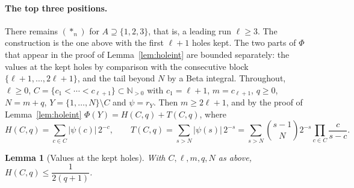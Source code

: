 \documentclass[11pt]{article}
\newtheorem{lemma}[theorem]{Lemma}
\newcommand{\N}{\mathbb N}
\begin{document}
\paragraph{The top three positions.}
There remains $(\ast_n)$ for $A\supseteq\{1,2,3\}$, that is, a leading run
$\ell\ge3$.  The construction is the one above with the first $\ell+1$ holes kept.
The two parts of $\Phi$ that appear in the proof of Lemma~\ref{lem:holeint}
are bounded separately: the values at the kept holes by comparison with the
consecutive block $\{\ell+1,\ldots,2\ell+1\}$, and the tail beyond $N$ by a Beta
integral.  Throughout, $\ell\ge0$, $C=\{c_1<\cdots<c_{\ell+1}\}\subset\N_{>0}$ with
$c_1=\ell+1$, $m=c_{\ell+1}$, $q\ge0$, $N=m+q$, $Y=\{1,\ldots,N\}\setminus C$ and
$\psi=r_Y$.  Then $m\ge2\ell+1$, and by the proof of Lemma~\ref{lem:holeint}
$\Phi(Y)=H(C,q)+T(C,q)$, where
\[
  H(C,q)=\sum_{c\in C}|\psi(c)|\,2^{-c},\qquad
  T(C,q)=\sum_{s>N}|\psi(s)|\,2^{-s}
        =\sum_{s>N}\binom{s-1}N2^{-s}\prod_{c\in C}\frac c{s-c}.
\]

\begin{lemma}[Values at the kept holes]\label{lem:holevals}
With $C,\ell,m,q,N$ as above, $H(C,q)\le\dfrac1{2(q+1)}$.
\end{lemma}
\end{document}
